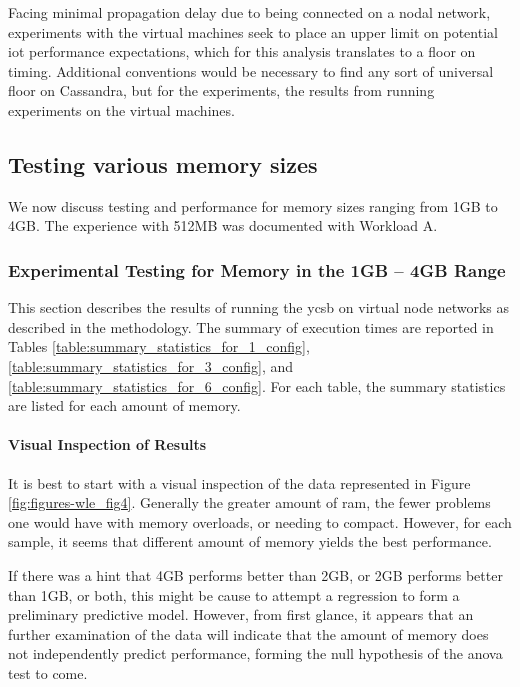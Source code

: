 Facing minimal propagation delay due to being connected on a nodal network, experiments with the virtual machines seek to place an upper limit on potential \gls{iot} performance expectations, which for this analysis translates to a floor on timing.  Additional conventions would be necessary to find any sort of universal floor on Cassandra, but for the experiments, the results from running experiments on the virtual machines.

\subsection{Testing various memory sizes}

We now discuss testing and performance for memory sizes ranging from 1GB to 4GB.  The experience with 512MB was documented with Workload A.

\subsubsection{Experimental Testing for Memory in the 1GB – 4GB Range}

This section describes the results of running the \gls{ycsb} on virtual node networks as described in the methodology.  The summary of execution times are reported in Tables \ref{table:summary_statistics_for_1_config}, \ref{table:summary_statistics_for_3_config}, and \ref{table:summary_statistics_for_6_config}.  For each table, the summary statistics are listed for each amount of memory.

\paragraph{Visual Inspection of Results}

It is best to start with a visual inspection of the data represented in Figure \ref{fig:figures-wle_fig4}.  Generally the greater amount of \gls{ram}, the fewer problems one would have with memory overloads, or needing to compact. However, for each sample, it seems that different amount of memory yields the best performance.

If there was a hint that 4GB performs better than 2GB, or 2GB performs better than 1GB, or both, this might be cause to attempt a regression to form a preliminary predictive model.  However, from first glance, it appears that an further examination of the data will indicate that the amount of memory does not independently predict performance, forming the null hypothesis of the \gls{anova} test to come.

